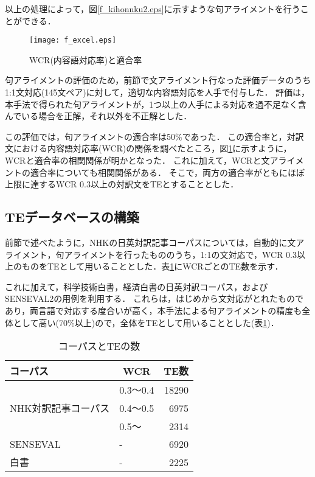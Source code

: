 \documentclass{nlp}
\begin{document}
\vspace{5mm}

以上の処理によって，図\ref{f_kihonnku2.eps}に示すような句アライメントを行うことができる．

\begin{figure}
 \begin{center}
  \texttt{[image: f\_excel.eps]}
 \end{center}
 \caption{WCR(内容語対応率)と適合率}
 \label{f_excel.eps}
\end{figure}


句アライメントの評価のため，前節で文アライメント行なった評価データのうち1:1文対応(145文ペア)に対して，適切な内容語対応を人手で付与した．
評価は，本手法で得られた句アライメントが，1つ以上の人手による対応を過不足なく含んでいる場合を正解，それ以外を不正解とした．

この評価では，句アライメントの適合率は50\%であった．
この適合率と，対訳文における内容語対応率(WCR)の関係を調べたところ，図\ref{f_excel.eps}に示すように，WCRと適合率の相関関係が明かとなった．
これに加えて，WCRと文アライメントの適合率についても相関関係がある．
そこで，両方の適合率がともにほぼ上限に達するWCR 0.3以上の対訳文をTEとすることとした．

\subsection{TEデータベースの構築}

前節で述べたように，NHKの日英対訳記事コーパスについては，自動的に文アライメント，句アライメントを行ったもののうち，1:1の文対応で，WCR 0.3以上のものをTEとして用いることとした．表\ref{TEの種類と数}にWCRごとのTE数を示す．

これに加えて，科学技術白書，経済白書の日英対訳コーパス，およびSENSEVAL2\cite{Kurohashi2001}の用例を利用する．
これらは，はじめから文対応がとれたものであり，両言語で対応する度合いが高く，本手法による句アライメントの精度も全体として高い(70\%以上)ので，全体をTEとして用いることとした(表\ref{TEの種類と数})．

\begin{table}
\caption{コーパスとTEの数}
\label{TEの種類と数}
\begin{center}
\begin{tabular}{llr}
\hline
	コーパス		&\multicolumn{1}{c}{WCR}	&\multicolumn{1}{c}{TE数}	\\
\hline
				&	0.3〜0.4 		&18290				\\
	NHK対訳記事コーパス	&	0.4〜0.5 		&6975				\\
				&	0.5〜 			&2314				\\
\hline
	SENSEVAL		&	-			&6920				\\
	白書			&	-			&2225				\\
\hline
\end{tabular}
\end{center}
\end{table}
\end{document}

